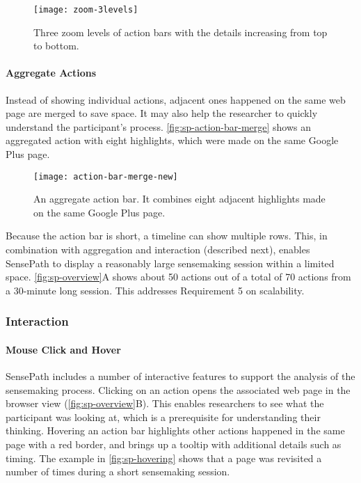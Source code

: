 \begin{figure}
\centering
\texttt{[image: zoom-3levels]}
\caption[Three zoom levels of action bars]{Three zoom levels of action bars with the details increasing from top to bottom.}
\label{fig:sp-timeline-zoom}
\end{figure}

\paragraph{Aggregate Actions}
Instead of showing individual actions, adjacent ones happened on the same web page are merged to save space. It may also help the researcher to quickly understand the participant's process. \autoref{fig:sp-action-bar-merge} shows an aggregated action with eight highlights, which were made on the same Google Plus page.

\begin{figure}
\centering
\texttt{[image: action-bar-merge-new]}
\caption[An aggregate action bar]{An aggregate action bar. It combines eight adjacent highlights made on the same Google Plus page.}
\label{fig:sp-action-bar-merge}
\end{figure}

Because the action bar is short, a timeline can show multiple rows. This, in combination with aggregation and interaction (described next), enables SensePath to display a reasonably large sensemaking session within a limited space. \autoref{fig:sp-overview}A shows about 50 actions out of a total of 70 actions from a 30-minute long session. This addresses Requirement 5 on scalability.

\subsubsection{Interaction}
\paragraph{Mouse Click and Hover}
SensePath includes a number of interactive features to support the analysis of the sensemaking process. Clicking on an action opens the associated web page in the browser view (\autoref{fig:sp-overview}B). This enables researchers to see what the participant was looking at, which is a prerequisite for understanding their thinking. Hovering an action bar highlights other actions happened in the same page with a red border, and brings up a tooltip with additional details such as timing. The example in \autoref{fig:sp-hovering} shows that a page was revisited a number of times during a short sensemaking session.

